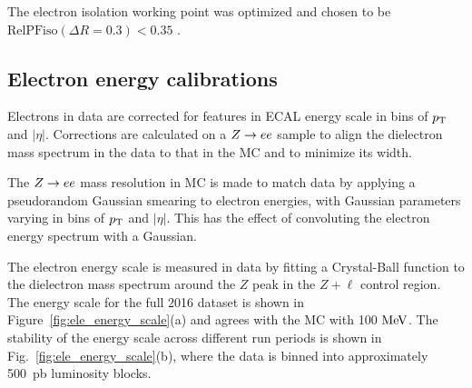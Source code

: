 The electron isolation working point was optimized and chosen to be $\text{RelPFiso}(\Delta R = 0.3) < 0.35$ \cite{AN-15-277}. 


\subsection{Electron energy calibrations}

Electrons in data are corrected for features in ECAL energy scale
in bins of $p_{\rm{T}}$ and $\left| \eta \right|$. Corrections are calculated
on a $Z \to ee$ sample to align the dielectron 
mass spectrum in the data to that in the MC and to
minimize its width.

The $Z \to ee$ mass resolution in MC is made to match
data by applying a pseudorandom Gaussian smearing to electron energies,
with Gaussian parameters varying in bins of $p_{\rm{T}}$ and $\left| \eta \right|$.
This has the effect of convoluting the electron energy spectrum with a
Gaussian.

The electron energy scale is measured in data by fitting a Crystal-Ball function to the dielectron mass spectrum around the $Z$ peak in the $Z+\ell$ control region. 
The energy scale for the full 2016 dataset is shown in Figure~\ref{fig:ele_energy_scale}(a) and agrees with the MC with 100 $\mathrm{Me\kern -0.1em V}$. 
The stability of the energy scale across different run periods is shown in Fig.~\ref{fig:ele_energy_scale}(b), where the data is binned into approximately 500~pb luminosity blocks.


